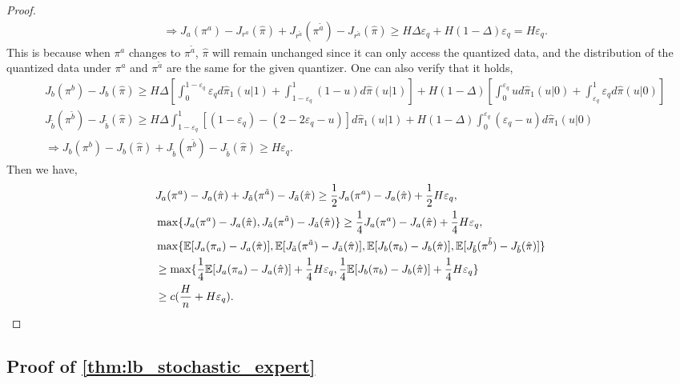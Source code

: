 \documentclass{article}
\begin{document}
\begin{proof}
\begin{align*}
        &\Rightarrow J_{a}(\pi^a)-J_{r^{a}}(\hat \pi)+J_{r^{\tilde a}}(\pi^{\tilde a})-J_{r^{\tilde a}}(\hat \pi)\geq H\Delta \varepsilon_q+H(1-\Delta)\varepsilon_q=H\varepsilon_q.
    \end{align*}
    This is because when $\pi^a$ changes to $\pi^{\tilde a}$, $\hat \pi$ will remain unchanged since it can only access the quantized data, and the distribution of the quantized data under $\pi^a$ and $\pi^{\tilde a}$ are the same for the given quantizer. One can also verify that it holds,
\begin{align*}
    &J_{b}(\pi^b)-J_b(\hat \pi)\geq H\Delta\left[\int_0^{1-\varepsilon_q}\varepsilon_q d\hat \pi_1(u|1)+\int_{1-\varepsilon_q}^1(1-u)d\hat \pi(u|1)\right]+H(1-\Delta)\left[\int_{0}^{\varepsilon_q}ud\hat \pi_1(u|0)+\int_{\varepsilon_q}^1 \varepsilon_qd\hat \pi(u|0)\right]\\
    & J_{\tilde b}(\pi^{\tilde b})-J_{\tilde b}(\hat \pi) \geq H\Delta\int_{1-\varepsilon_q}^1 [(1-\varepsilon_q)-(2-2\varepsilon_q-u)]d\hat \pi_1(u|1)+H(1-\Delta)\int_0^{\varepsilon_q}(\varepsilon_q-u)d\hat \pi_1(u|0)\\
    &\Rightarrow J_{b}(\pi^b)-J_b(\hat \pi)+J_{\tilde b}(\pi^{\tilde b})-J_{\tilde b}(\hat \pi)\geq H\varepsilon_q.
\end{align*}
Then we have,
        \begin{align*}
        &J_{a}(\pi^a)-J_{a}(\hat \pi)+J_{\tilde a}(\pi^{\tilde a})-J_{\tilde a}(\hat \pi)\geq \frac{1}{2}J_{{a}}(\pi^a)-J_{a}(\hat \pi)+\frac{1}{2}H\varepsilon_q,\\
        &\max\{J_{a}(\pi^a)-J_{a}(\hat \pi),J_{\tilde a}(\pi^{\tilde a})-J_{\tilde a}(\hat \pi)\}\geq \frac{1}{4}J_{{a}}(\pi^a)-J_{{a}}(\hat \pi)+\frac{1}{4}H\varepsilon_q,\\
         &\max\{\mathbb E[J_{a}(\pi_a)-J_{a}(\hat \pi)],\mathbb E[J_{\tilde a}(\pi^{\tilde a})-J_{{\tilde a}}(\hat \pi)],\mathbb E[J_{b}(\pi_b)-J_{b}(\hat \pi)],\mathbb E[J_{{\tilde b}}(\pi^{\tilde b})-J_{{\tilde b}}(\hat \pi)]\}\\
         &\geq \max\{\frac{1}{4}\mathbb E[J_{a}(\pi_a)-J_{a}(\hat \pi)]+\frac{1}{4}H\varepsilon_q, \frac{1}{4}\mathbb E[J_{b}(\pi_b)-J_{b}(\hat \pi)]+\frac{1}{4}H\varepsilon_q\}\\
         &\geq c(\frac{H}{n}+H\varepsilon_q). \qedhere
    \end{align*}
\end{proof}

\subsection{Proof of \texorpdfstring{\cref{thm:lb_stochastic_expert}}{Theorem 9}}
\end{document}
